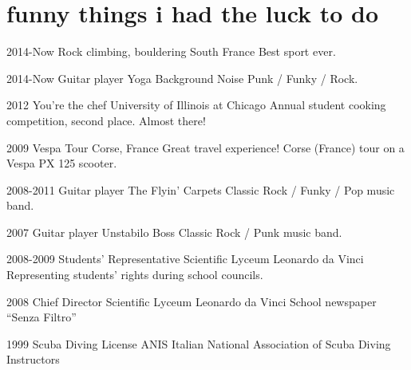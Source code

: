 \documentclass[]{friggeri-cv} %
\begin{document}
\section{funny things i had the luck to do}
\begin{entrylist}
\entry
{2014-Now}
{Rock climbing, bouldering}
{South France}
{Best sport ever.}

\entry
{2014-Now}
{Guitar player}
{Yoga Background Noise}
{Punk / Funky / Rock.}

\entry
{2012}
{You're the chef}
{University of Illinois at Chicago}
{Annual student cooking competition, second place. Almost there!}

\entry
{2009}
{Vespa Tour}
{Corse, France}
{Great travel experience! Corse (France) tour on a Vespa PX 125 scooter.}

\entry
{2008-2011}
{Guitar player}
{The Flyin' Carpets}
{Classic Rock / Funky / Pop music band.}

\entry
{2007}
{Guitar player}
{Unstabilo Boss}
{Classic Rock / Punk music band.}

\entry
{2008-2009}
{Students' Representative}
{Scientific Lyceum Leonardo da Vinci}
{Representing students' rights during school councils.}

\entry
{2008}
{Chief Director}
{Scientific Lyceum Leonardo da Vinci}
{School newspaper ``Senza Filtro''}

\entry
{1999}
{Scuba Diving License}
{ANIS}
{Italian National Association of Scuba Diving Instructors}
\end{entrylist}
\end{document}
